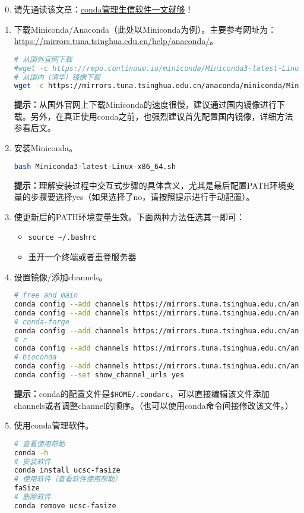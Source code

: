 \begin{enumerate}
  \setcounter{enumi}{-1}
  \item 请先通读该文章：\href{https://mp.weixin.qq.com/s?src=11&timestamp=1551313527&ver=1455&signature=8RgyfZ49Go2kN8oXSgy*8CQSnc7nAcMUgUoWkZbozQLYVHv6GLpgmQ*eVsFDBzJcD30gyRfhGPLUy4cdGvnv*xfwCse1d80LprTWIYMZj1A6YF4dy8C4uLqzcJ4jTHqT&new=1}{conda管理生信软件一文就够}！
  \item 下载Miniconda/Anaconda（此处以Miniconda为例）。主要参考网址为： \href{https://mirrors.tuna.tsinghua.edu.cn/help/anaconda/}{https://mirrors.tuna.tsinghua.edu.cn/help/anaconda/}。
\begin{lstlisting}[language=bash]
# 从国外官网下载
#wget -c https://repo.continuum.io/miniconda/Miniconda3-latest-Linux-x86_64.sh
# 从国内（清华）镜像下载
wget -c https://mirrors.tuna.tsinghua.edu.cn/anaconda/miniconda/Miniconda3-latest-Linux-x86_64.sh
\end{lstlisting}
\textbf{提示：}从国外官网上下载Miniconda的速度很慢，建议通过国内镜像进行下载。另外，在真正使用conda之前，也强烈建议首先配置国内镜像，详细方法参看后文。
  \item 安装Miniconda。
\begin{lstlisting}[language=bash]
bash Miniconda3-latest-Linux-x86_64.sh
\end{lstlisting}
\textbf{提示：}理解安装过程中交互式步骤的具体含义，尤其是最后配置PATH环境变量的步骤要选择yes（如果选择了no，请按照提示进行手动配置）。
  \item 使更新后的PATH环境变量生效。下面两种方法任选其一即可：
    \begin{itemize}
      \item \verb|source ~/.bashrc|
      \item 重开一个终端或者重登服务器
    \end{itemize}
  \item 设置镜像/添加channels。
\begin{lstlisting}[language=bash]
# free and main
conda config --add channels https://mirrors.tuna.tsinghua.edu.cn/anaconda/pkgs/free/
conda config --add channels https://mirrors.tuna.tsinghua.edu.cn/anaconda/pkgs/main/
# conda-forge
conda config --add channels https://mirrors.tuna.tsinghua.edu.cn/anaconda/cloud/conda-forge/
# r
conda config --add channels https://mirrors.tuna.tsinghua.edu.cn/anaconda/pkgs/r/
# bioconda
conda config --add channels https://mirrors.tuna.tsinghua.edu.cn/anaconda/cloud/bioconda/
conda config --set show_channel_urls yes
\end{lstlisting}
\textbf{提示：}conda的配置文件是\verb|$HOME/.condarc|，可以直接编辑该文件添加channels或者调整channel的顺序。（也可以使用conda命令间接修改该文件。）
  \item 使用conda管理软件。
\begin{lstlisting}[language=bash]
# 查看使用帮助
conda -h
# 安装软件
conda install ucsc-fasize
# 使用软件（查看软件使用帮助）
faSize
# 删除软件
conda remove ucsc-fasize
\end{lstlisting}
\end{enumerate}

